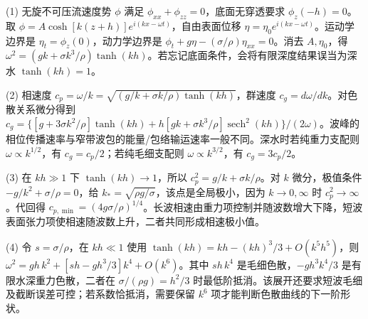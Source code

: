 (1) 无旋不可压流速度势 \(\phi\) 满足 \(\phi_{xx}+\phi_{zz}=0\)，底面无穿透要求 \(\phi_z(-h)=0\)。取 \(\phi=A\cosh[k(z+h)]e^{i(kx-\omega t)}\)，自由表面位移 \(\eta=\eta_0e^{i(kx-\omega t)}\)。运动学边界是 \(\eta_t=\phi_z(0)\)，动力学边界是 \(\phi_t+g\eta-(\sigma/\rho)\eta_{xx}=0\)。消去 \(A,\eta_0\)，得 \(\omega^2=(gk+\sigma k^3/\rho)\tanh(kh)\)。若忘记底面条件，会将有限深度结果误当为深水 \(\tanh(kh)=1\)。

(2) 相速度 \(c_p=\omega/k=\sqrt{(g/k+\sigma k/\rho)\tanh(kh)}\)，群速度 \(c_g=d\omega/dk\)。对色散关系微分得到 \(c_g=\{[g+3\sigma k^2/\rho]\tanh(kh)+h[gk+\sigma k^3/\rho]\operatorname{sech}^2(kh)\}/(2\omega)\)。波峰的相位传播速率与窄带波包的能量/包络输运速率一般不同。深水时若纯重力支配则 \(\omega\propto k^{1/2}\)，有 \(c_g=c_p/2\)；若纯毛细支配则 \(\omega\propto k^{3/2}\)，有 \(c_g=3c_p/2\)。

(3) 在 \(kh\gg1\) 下 \(\tanh(kh)\to1\)，所以 \(c_p^2=g/k+\sigma k/\rho\)。对 \(k\) 微分，极值条件 \(-g/k^2+\sigma/\rho=0\)，给 \(k_*=\sqrt{\rho g/\sigma}\)，该点是全局极小，因为 \(k\to0,\infty\) 时 \(c_p^2\to\infty\)。代回得 \(c_{p,\min}=(4g\sigma/\rho)^{1/4}\)。长波相速由重力项控制并随波数增大下降，短波表面张力项使相速随波数上升，二者共同形成相速极小值。

(4) 令 \(s=\sigma/\rho\)，在 \(kh\ll1\) 使用 \(\tanh(kh)=kh-(kh)^3/3+O(k^5h^5)\)，则 \(\omega^2=gh\,k^2+[sh-gh^3/3]k^4+O(k^6)\)。其中 \(sh\,k^4\) 是毛细色散，\(-gh^3k^4/3\) 是有限水深重力色散，二者在 \(\sigma/(\rho g)=h^2/3\) 时最低阶抵消。该展开还要求短波毛细及截断误差可控；若系数恰抵消，需要保留 \(k^6\) 项才能判断色散曲线的下一阶形状。
